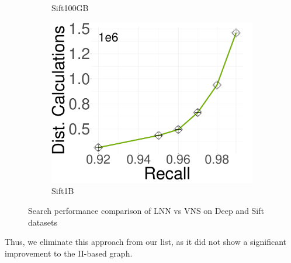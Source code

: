 \begin{figure}[ht]
\begin{subfigure}[b]{0.28\textwidth}
                \caption{Sift100GB}
        \label{fig:oigas:cnn:100:sift}
    \end{subfigure}
    \hspace{0.4cm}
             \begin{subfigure}[b]{0.28\textwidth}
                 \captionsetup{justification=centering}
	\centering	
           \includegraphics[width=\textwidth]{../img/oigas/CandNeighbors/search/1B/sift_DC.pdf}
        \caption{Sift1B}
        \label{fig:oigas:cnn:1B:sift}
    \end{subfigure}
    \caption{Search performance comparison of LNN vs VNS on Deep and Sift datasets}
    \label{fig:oigas:cnn}
\end{figure}

Thus, we eliminate this approach from our list, as it did not show a significant improvement to the II-based graph.




